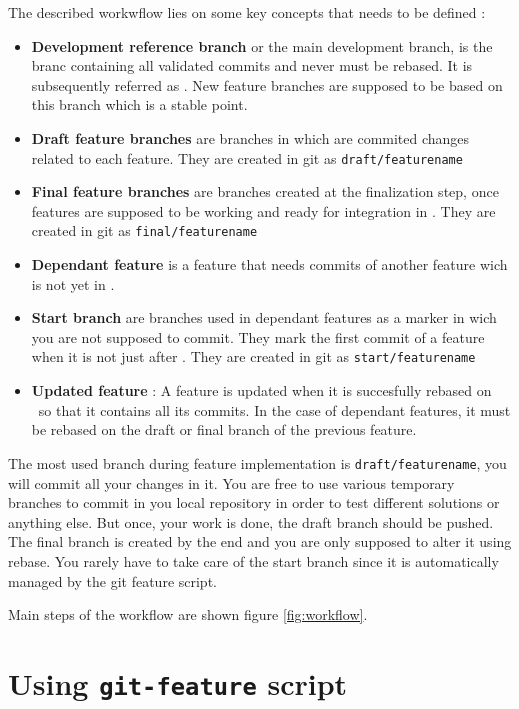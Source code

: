 The described workwflow lies on some key concepts that needs to be defined :
\begin{itemize}
 \item \textbf{Development reference branch} or the main development branch, is the branc containing all validated commits and never must be rebased. It is subsequently referred as \texttt{\DEVREF}. New feature branches are supposed to be based on this branch which is a stable point.
 \item \textbf{Draft feature branches} are branches in which are commited changes related to each feature. They are created in git as \texttt{draft/featurename} 
 \item \textbf{Final feature branches} are branches created at the finalization step, once features are supposed to be working and ready for integration in \DEVREF. They are created in git as \texttt{final/featurename} 
 \item \textbf{Dependant feature} is a feature that needs commits of another feature wich is not yet in \DEVREF.
 \item \textbf{Start branch} are branches used in dependant features as a marker in wich you are not supposed to commit. They mark the first commit of a feature when it is not just after \DEVREF. They are created in git as \texttt{start/featurename} 
 \item \textbf{Updated feature} : A feature is updated when it is succesfully rebased on \DEVREF~so that it contains all its commits. In the case of dependant features, it must be rebased on the draft or final branch of the previous feature.
\end{itemize}

The most used branch during feature implementation is \texttt{draft/featurename}, you will commit all your changes in it. You are free to use various temporary branches to commit in you local repository in order to test different solutions or anything else. But once, your work is done, the draft branch should be pushed. The final branch is created by the end and you are only supposed to alter it using rebase. You rarely have to take care of the start branch since it is automatically managed by the git feature script.


Main steps of the workflow are shown figure \ref{fig:workflow}.


\section{Using \texttt{git-feature} script}

